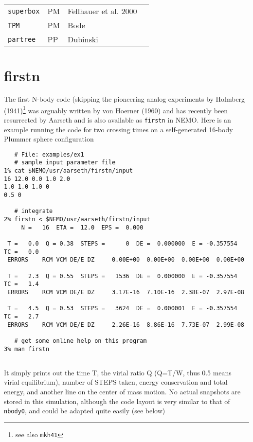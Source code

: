 {{\begin{center}
\begin{table}[h]
\begin{tabular}{||l|l|l|l||}
{\tt superbox} & PM &  Fellhauer et al. 2000 & \\

{\tt TPM} & PM &  Bode & \\

{\tt partree} & PP &  Dubinski & \\


\hline 

\end{tabular}
\label{t:codes}
\end{table}
\end{center}

\section{firstn}

The first N-body code (skipping the pioneering analog experiments by 
Holmberg (1941)\footnote{see also {\tt mkh41}}
was arguably written by von Hoerner (1960)  %
and has recently
been resurrected by Aarseth and is also available as {\tt firstn} in NEMO. Here is an
example running the code for two crossing times on a self-generated 16-body
Plummer sphere configuration

\footnotesize\begin{verbatim}
   # File: examples/ex1
   # sample input parameter file
1% cat $NEMO/usr/aarseth/firstn/input
16 12.0 0.0 1.0 2.0
1.0 1.0 1.0 0
0.5 0

   # integrate 
2% firstn < $NEMO/usr/aarseth/firstn/input
     N =   16  ETA =  12.0  EPS =  0.000
 
 T =   0.0  Q = 0.38  STEPS =      0  DE =  0.000000  E = -0.357554  TC =   0.0
 ERRORS    RCM VCM DE/E DZ     0.00E+00  0.00E+00  0.00E+00  0.00E+00
 
 T =   2.3  Q = 0.55  STEPS =   1536  DE =  0.000000  E = -0.357554  TC =   1.4
 ERRORS    RCM VCM DE/E DZ     3.17E-16  7.10E-16  2.38E-07  2.97E-08
 
 T =   4.5  Q = 0.53  STEPS =   3624  DE =  0.000001  E = -0.357554  TC =   2.7
 ERRORS    RCM VCM DE/E DZ     2.26E-16  8.86E-16  7.73E-07  2.99E-08

   # get some online help on this program
3% man firstn
 
\end{verbatim}\normalsize

It simply prints out the time T, the virial ratio Q (Q=T/W, thus 0.5 means virial
equilibrium), number of STEPS taken, energy conservation and total energy, and another 
line on the center of mass motion. No actual snapshots are stored in this 
simulation, although the code layout is very similar to that of {\tt nbody0},
and could be adapted quite easily (see below)

}}
